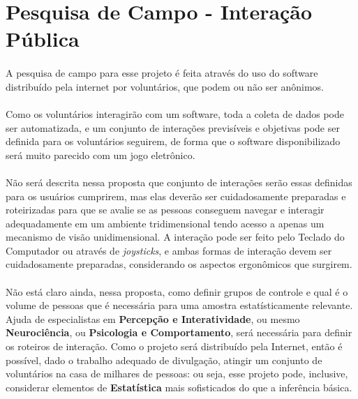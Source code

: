 \documentclass{article}
\begin{document}
	\section{Pesquisa de Campo - Interação Pública} \label{pc}
	\paragraph{}
	A pesquisa de campo para esse projeto é feita através do uso do software distribuído pela internet por voluntários, que podem ou não ser anônimos.
	
	\paragraph{}
	Como os voluntários interagirão com um software, toda a coleta de dados pode ser automatizada, e um conjunto de interações previsíveis e objetivas pode ser definida para os voluntários seguirem, de forma que o software disponibilizado será muito parecido com um jogo eletrônico.
	
	\paragraph{}
	Não será descrita nessa proposta que conjunto de interações serão essas definidas para os usuários cumprirem, mas elas deverão ser cuidadosamente preparadas e roteirizadas para que se avalie se as pessoas conseguem navegar e interagir adequadamente em um ambiente tridimensional tendo acesso a apenas um mecanismo de visão unidimensional. A interação pode ser feito pelo Teclado do Computador ou através de \textit{joysticks}, e ambas formas de interação devem ser cuidadosamente preparadas, considerando os aspectos ergonômicos que surgirem.
	
	\paragraph{}
	Não está claro ainda, nessa proposta, como definir grupos de controle e qual é o volume de pessoas que é necessária para uma amostra estatísticamente relevante. Ajuda de especialistas em \textbf{Percepção e Interatividade}, ou mesmo \textbf{Neurociência}, ou \textbf{Psicologia e Comportamento}, será necessária para definir os roteiros de interação. Como o projeto será distribuído pela Internet, então é possível, dado o trabalho adequado de divulgação, atingir um conjunto de voluntários na casa de milhares de pessoas: ou seja, esse projeto pode, inclusive, considerar elementos de \textbf{Estatística} mais sofisticados do que a inferência básica.
\end{document}
